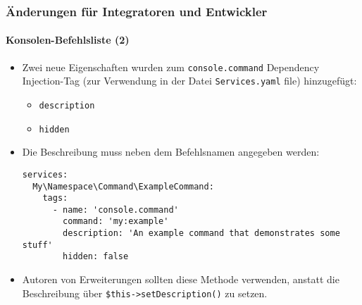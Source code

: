 %

\begin{frame}[fragile]
	\frametitle{Änderungen für Integratoren und Entwickler}
	\framesubtitle{Konsolen-Befehlsliste (2)}


	\begin{itemize}
		\item Zwei neue Eigenschaften wurden zum \texttt{console.command}
			Dependency Injection-Tag (zur Verwendung in der Datei \texttt{Services.yaml} file) hinzugefügt:
			\begin{itemize}
				\item \texttt{description}
				\item \texttt{hidden}
			\end{itemize}
			\vspace{0.2cm}
		\item Die Beschreibung muss neben dem Befehlsnamen angegeben werden:
\begin{lstlisting}
services:
  My\Namespace\Command\ExampleCommand:
    tags:
      - name: 'console.command'
        command: 'my:example'
        description: 'An example command that demonstrates some stuff'
        hidden: false
\end{lstlisting}

		\item Autoren von Erweiterungen sollten diese Methode verwenden,
			anstatt die Beschreibung über \texttt{\$this->setDescription()} zu setzen.

	\end{itemize}

\end{frame}

